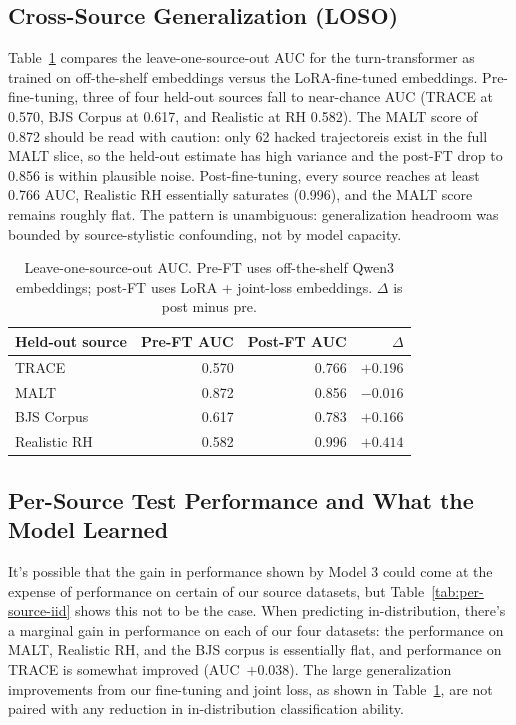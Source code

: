 \documentclass{article}
\begin{document}
\subsection{Cross-Source Generalization (LOSO)}

Table~\ref{tab:loso} compares the leave-one-source-out AUC for the turn-transformer as trained on off-the-shelf embeddings versus the LoRA-fine-tuned embeddings. Pre-fine-tuning, three of four held-out sources fall to near-chance AUC (TRACE at 0.570, BJS Corpus at 0.617, and Realistic at RH 0.582). The MALT score of 0.872 should be read with caution: only 62 hacked trajectoreis exist in the full MALT slice, so the held-out estimate has high variance and the post-FT drop to 0.856 is within plausible noise. Post-fine-tuning, every source reaches at least 0.766 AUC, Realistic RH essentially saturates (0.996), and the MALT score remains roughly flat. The pattern is unambiguous: generalization headroom was bounded by source-stylistic confounding, not by model capacity.

\begin{table}[h]
  \caption{Leave-one-source-out AUC. Pre-FT uses off-the-shelf Qwen3 embeddings; post-FT uses LoRA + joint-loss embeddings. $\Delta$ is post minus pre.}
  \label{tab:loso}
  \centering
  \begin{tabular}{lrrr}
    \toprule
    Held-out source & Pre-FT AUC & Post-FT AUC & $\Delta$ \\
    \midrule
    TRACE          & 0.570 & 0.766 & $+0.196$ \\
    MALT           & 0.872 & 0.856 & $-0.016$ \\
    BJS Corpus     & 0.617 & 0.783 & $+0.166$ \\
    Realistic RH   & 0.582 & 0.996 & $+0.414$ \\
    \bottomrule
  \end{tabular}
\end{table}

\subsection{Per-Source Test Performance and What the Model Learned}

It's possible that the gain in performance shown by Model 3 could come at the expense of performance on certain of our source datasets, but Table~\ref{tab:per-source-iid} shows this not to be the case. When predicting in-distribution, there's a marginal gain in performance on each of our four datasets: the performance on MALT, Realistic RH, and the BJS corpus is essentially flat, and performance on TRACE is somewhat improved (AUC~$+0.038$). The large generalization improvements from our fine-tuning and joint loss, as shown in Table~\ref{tab:loso}, are not paired with any reduction in in-distribution classification ability. 
\end{document}
